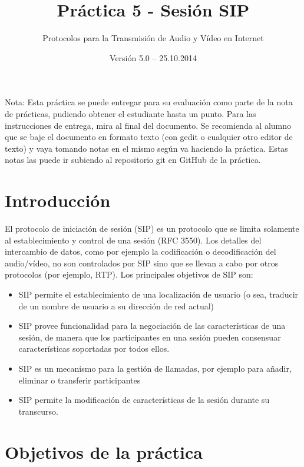 \documentclass[11pt,a4paper]{article}
\begin{document}
\title{Práctica 5 - Sesión SIP}
\author{Protocolos para la Transmisión de Audio y Vídeo en Internet}
\date{Versión 5.0 – 25.10.2014}


\maketitle

Nota: Esta práctica se puede entregar para su evaluación como parte de la nota de prácticas, pudiendo obtener el estudiante hasta un punto. Para las instrucciones de entrega, mira al final del documento. Se recomienda al alumno que se baje el documento en formato texto (con gedit o cualquier otro editor de texto) y vaya tomando notas en el mismo según va haciendo la práctica. Estas notas las puede ir subiendo al repositorio git en GitHub de la práctica.

\section{Introducción}

El protocolo de iniciación de sesión (SIP) es un protocolo que se limita solamente al establecimiento y control de una sesión (RFC 3550). Los detalles del intercambio de datos, como por ejemplo la codificación o decodificación del audio/vídeo, no son controlados por SIP sino que se llevan a cabo por otros protocolos (por ejemplo, RTP). Los principales objetivos de SIP son:

\begin{itemize}
  \item SIP permite el establecimiento de una localización de usuario (o sea, traducir de un nombre de usuario a su dirección de red actual)
  \item SIP provee funcionalidad para la negociación de las características de una sesión, de manera que los participantes en una sesión pueden consensuar características soportadas por todos ellos.
  \item SIP es un mecanismo para la gestión de llamadas, por ejemplo para añadir, eliminar o transferir participantes
  \item SIP permite la modificación de características de la sesión durante su transcurso.
\end{itemize}

\section{Objetivos de la práctica}
\end{document}
